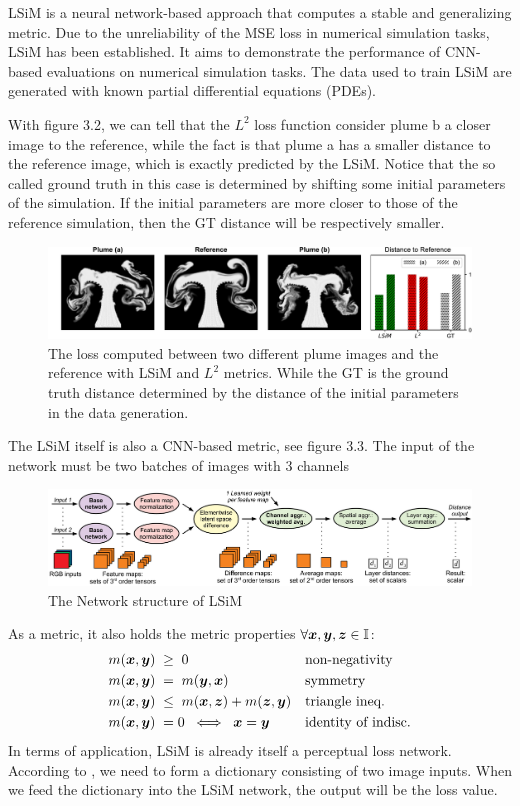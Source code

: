 \documentclass[a4paper,12pt,twoside]{report}
\begin{document}
LSiM \cite{kohl2020learning} is a neural network-based approach that computes a stable and generalizing metric. Due to the unreliability of the MSE loss in numerical simulation tasks, LSiM has been established. It aims to demonstrate the performance of CNN-based evaluations on numerical simulation tasks. The data used to train LSiM are generated with known partial differential equations (PDEs). 

With figure 3.2, we can tell that the $L^2$ loss function consider plume b a closer image to the reference, while the fact is that plume a has a smaller distance to the reference image, which is exactly predicted by the LSiM. Notice that the so called ground truth in this case is determined by shifting some initial parameters of the simulation. If the initial parameters are more closer to those of the reference simulation, then the GT distance will be respectively smaller.

\begin{figure}
\centering
\includegraphics[width=1.0\textwidth]{Plumes.pdf}
\caption{The loss computed between two different plume images and the reference with LSiM and $L^2$ metrics. While the GT is the ground truth distance determined by the distance of the initial parameters in the data generation. }
\end{figure}
The LSiM itself is also a CNN-based metric, see figure 3.3. The input of the network must be two batches of images with 3 channels
\begin{figure}
\centering
\includegraphics[width=1.0\textwidth]{DistanceComputation.pdf}
\caption{The Network structure of LSiM}
\end{figure}

As a metric, it also holds the metric properties $\forall {\bm{x}},{\bm{y}},{\bm{z}} \in {\mathbb{I}}$:
\begin{align}
    m({\bm{x}},{\bm{y}}) \; &\geq \; 0                && \text{non-negativity} \label{eq: NonNeg}\\
    m({\bm{x}},{\bm{y}}) \; &= \; m({\bm{y}},{\bm{x}})              && \text{symmetry} \label{eq: Sym}\\
    m({\bm{x}},{\bm{y}}) \; &\leq \; m({\bm{x}},{\bm{z}}) + m({\bm{z}},{\bm{y}})  && \text{triangle ineq.} \label{eq: TriIneq}\\
    m({\bm{x}},{\bm{y}}) \; &= 0 \; \iff \; {\bm{x}} = {\bm{y}}     && \text{identity of indisc.} \label{eq: IoI}
\end{align}
In terms of application, LSiM is already itself a perceptual loss network.  According to \citeauthor{kohl2020learning}, we need to form a dictionary consisting of two image inputs. When we feed the dictionary into the LSiM network, the output will be the loss value.
\end{document}
